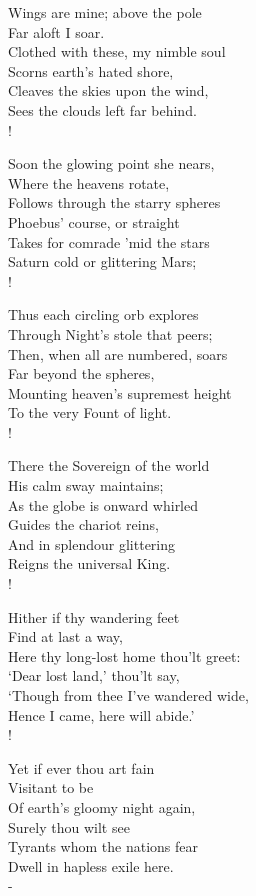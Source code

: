 \documentclass[12pt]{book}
\newenvironment{vpoem}[1]%
  {\def\poemvsindentlines{#1}\begin{poem}\small}%
  {\end{poem}\def\poemvsindentlines{\relax}}
\begin{document}
\begin{vpoem}{24}
    Wings are mine; above the pole \\
      Far aloft I soar. \\
    Clothed with these, my nimble soul \\
      Scorns earth's hated shore, \\
    Cleaves the skies upon the wind, \\
    Sees the clouds left far behind. \\!

    Soon the glowing point she nears, \\
      Where the heavens rotate, \\
    Follows through the starry spheres \\
      Phoebus' course, or straight \\
    Takes for comrade 'mid the stars \\
    Saturn cold or glittering Mars; \\!

    Thus each circling orb explores \\
      Through Night's stole that peers; \\
    Then, when all are numbered, soars \\
      Far beyond the spheres, \\
    Mounting heaven's supremest height \\
    To the very Fount of light. \\!

    There the Sovereign of the world \\
      His calm sway maintains; \\
    As the globe is onward whirled \\
      Guides the chariot reins, \\
    And in splendour glittering \\
    Reigns the universal King. \\!

    Hither if thy wandering feet \\
      Find at last a way, \\
    Here thy long-lost home thou'lt greet: \\
      `Dear lost land,' thou'lt say, \\
    `Though from thee I've wandered wide, \\
    Hence I came, here will abide.' \\!

    Yet if ever thou art fain \\
      Visitant to be \\
    Of earth's gloomy night again, \\
      Surely thou wilt see \\
    Tyrants whom the nations fear \\
    Dwell in hapless exile here. \\-
\end{vpoem}
\end{document}
